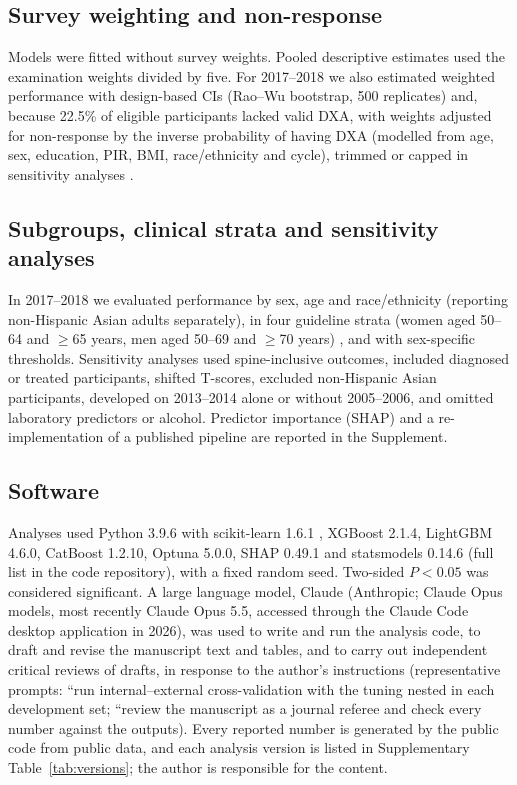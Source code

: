 \documentclass[11pt,a4paper]{article}
\begin{document}
\subsection{Survey weighting and non-response}
Models were fitted without survey weights. Pooled descriptive estimates used the examination weights divided by five. For 2017--2018 we also estimated weighted performance with design-based CIs (Rao--Wu bootstrap, 500 replicates) \cite{chen2020,raowu1988} and, because 22.5\% of eligible participants lacked valid DXA, with weights adjusted for non-response by the inverse probability of having DXA (modelled from age, sex, education, PIR, BMI, race/ethnicity and cycle), trimmed or capped in sensitivity analyses \cite{potter1990,lee2011}.

\subsection{Subgroups, clinical strata and sensitivity analyses}
In 2017--2018 we evaluated performance by sex, age and race/ethnicity (reporting non-Hispanic Asian adults separately), in four guideline strata (women aged 50--64 and $\ge$65 years, men aged 50--69 and $\ge$70 years) \cite{uspstf2025}, and with sex-specific thresholds. Sensitivity analyses used spine-inclusive outcomes, included diagnosed or treated participants, shifted T-scores, excluded non-Hispanic Asian participants, developed on 2013--2014 alone or without 2005--2006, and omitted laboratory predictors or alcohol. Predictor importance (SHAP) \cite{lundberg2017} and a re-implementation of a published pipeline are reported in the Supplement.

\subsection{Software}
Analyses used Python 3.9.6 with scikit-learn 1.6.1 \cite{pedregosa2011}, XGBoost 2.1.4, LightGBM 4.6.0, CatBoost 1.2.10, Optuna 5.0.0, SHAP 0.49.1 and statsmodels 0.14.6 (full list in the code repository), with a fixed random seed. Two-sided $P<0.05$ was considered significant. A large language model, Claude (Anthropic; Claude Opus models, most recently Claude Opus 5.5, accessed through the Claude Code desktop application in 2026), was used to write and run the analysis code, to draft and revise the manuscript text and tables, and to carry out independent critical reviews of drafts, in response to the author's instructions (representative prompts: ``run internal--external cross-validation with the tuning nested in each development set; ``review the manuscript as a journal referee and check every number against the outputs). Every reported number is generated by the public code from public data, and each analysis version is listed in Supplementary Table~\ref{tab:versions}; the author is responsible for the content.
\end{document}
